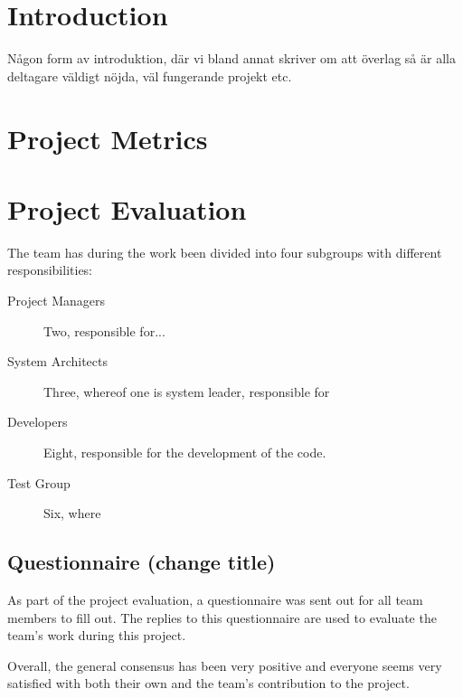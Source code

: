 \documentclass[a4paper]{article}
\begin{document}
\section{Introduction}
Någon form av introduktion, där vi bland annat skriver om att överlag så är alla deltagare väldigt nöjda, väl fungerande projekt etc. 

\section{Project Metrics}



\section{Project Evaluation}

The team has during the work been divided into four subgroups with different responsibilities:

\begin{description}
\item[Project Managers] Two, responsible for...
\item[System Architects] Three, whereof one is system leader, responsible for
\item[Developers] Eight, responsible for the development of the code.
\item[Test Group] Six, where
\end{description}


\subsection{Questionnaire (change title)}
As part of the project evaluation, a questionnaire was sent out for all team members to fill out. The replies to this questionnaire are used to evaluate the team's work during this project.

Overall, the general consensus has been very positive and everyone seems very satisfied with both their own and the team's contribution to the project. 
\end{document}

